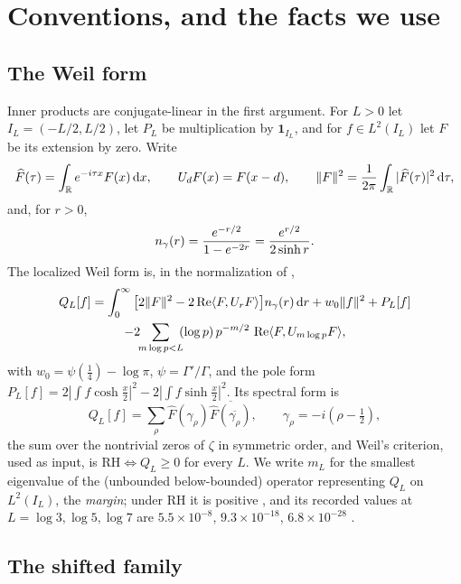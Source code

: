 \section{Conventions, and the facts we use}\label{sec:conventions}

\subsection{The Weil form}

Inner products are conjugate-linear in the first argument. For $L>0$ let
$I_L=(-L/2,L/2)$, let $P_L$ be multiplication by $\mathbf 1_{I_L}$, and for
$f\in L^2(I_L)$ let $F$ be its extension by zero. Write
\begin{equation}\label{eq:fourier}
 \widehat F(\tau)=\int_\mathbb R e^{-i\tau x}F(x)\,\mathrm d x,\qquad
 U_dF(x)=F(x-d),\qquad
 \lVert F\rVert^2=\frac1{2\pi}\int_\mathbb R|\widehat F(\tau)|^2\,\mathrm d\tau ,
\end{equation}
and, for $r>0$,
\begin{equation}\label{eq:ngamma}
 n_{\gamma}(r)=\frac{e^{-r/2}}{1-e^{-2r}}=\frac{e^{r/2}}{2\sinh r}.
\end{equation}
The localized Weil form is, in the normalization of \cite{WilsonLines},
\begin{multline}\label{eq:target}
 Q_L[f]=\int_0^\infty\big[2\lVert F\rVert^2-2\operatorname{Re}\langle F,U_rF\rangle\big]n_{\gamma}(r)\,\mathrm d r
 +w_0\lVert f\rVert^2+P_L[f]\\
 -2\!\!\sum_{m\log p<L}\!\!(\log p)\,p^{-m/2}\,\operatorname{Re}\langle F,U_{m\log p}F\rangle,
\end{multline}
with $w_0=\psi(\frac14)-\log\pi$, $\psi=\Gamma'/\Gamma$, and the pole form
$P_L[f]=2|\int f\cosh\frac x2|^2-2|\int f\sinh\frac x2|^2$. Its spectral form is
\begin{equation}\label{eq:spectral}
 Q_L[f]=\sum_\rho\widehat F(\gamma_\rho)\overline{\widehat F(\overline{\gamma_\rho})},
 \qquad\gamma_\rho=-i(\rho-\tfrac12),
\end{equation}
the sum over the nontrivial zeros of $\zeta$ in symmetric order, and Weil's
criterion, used as input, is $\mathrm{RH}\iff Q_L\geq0$ for every $L$. We write
$m_L$ for the smallest eigenvalue of the (unbounded below-bounded) operator
representing $Q_L$ on $L^2(I_L)$, the \emph{margin}; under RH it is positive
\cite[Section~8]{WilsonLines}, and its recorded values at
$L=\log3,\log5,\log7$ are $5.5\times10^{-8}$, $9.3\times10^{-18}$,
$6.8\times10^{-28}$ \cite{CriticalPath,FrameBound}.

\subsection{The shifted family}

